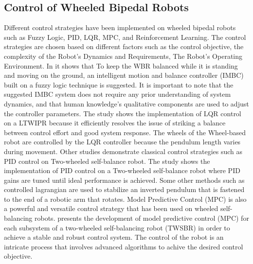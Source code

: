 \subsection{Control of Wheeled Bipedal Robots}
Different control strategies have been implemented on wheeled bipedal robots such as Fuzzy Logic, PID, LQR, MPC, and Reinforcement Learning.
The control strategies are chosen based on different factors such as the control objective, the complexity of the Robot's Dynamics and Requirements, The Robot's Operating Environment. In \cite{hsu2022implementation} it shows that To keep the WBR balanced while it is standing and moving on the ground, an intelligent motion and balance controller (IMBC) built on a fuzzy logic technique is suggested.
It is important to note that the suggested IMBC system does not require any prior understanding of system dynamics, and that human knowledge's qualitative components are used to adjust the controller parameters. The study \cite {cui2022modeling} shows the implementation of LQR control on a LTWIPR because it efficiently resolves the issue of striking a balance between control effort and good system response.
The wheels of the Wheel-based robot are controlled by the LQR controller because the pendulum length varies during movement.
Other studies demonstrate classical control strategies such as PID control on Two-wheeled self-balance robot.
The study \cite{zimit2018modelling}shows the implementation of PID control on a Two-wheeled self-balance robot where PID gains are tuned until ideal performance is achieved.
Some other methods such as controlled lagrangian are used to stabilize an inverted pendulum that is fastened to the end of a robotic arm that rotates\cite{bloch1999stabilization}.
Model Predictive Control (MPC) is also a powerful and versatile control strategy that has been used on wheeled self-balancing robots. \cite{azimi2013model} presents the development of model predictive control (MPC) for each subsystem of a two-wheeled self-balancing robot (TWSBR) in order to achieve a stable and robust control system. The control of the robot is an intricate process that involves advanced algorithms to achive the desired control objective.
\vspace{3 cm}
